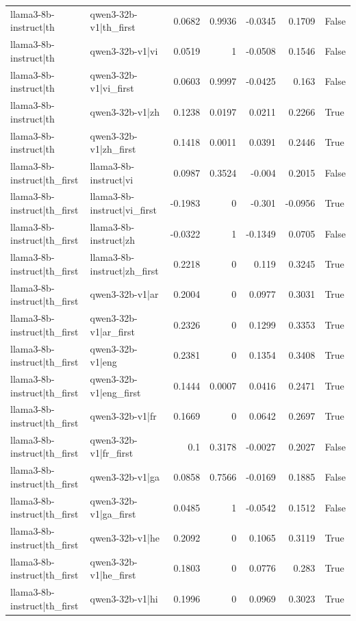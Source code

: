 \begin{table}
\begin{tabular}{l l r r r r l}
llama3-8b-instruct|th & qwen3-32b-v1|th_first & 0.0682 & 0.9936 & -0.0345 & 0.1709 & False \\
llama3-8b-instruct|th & qwen3-32b-v1|vi & 0.0519 & 1 & -0.0508 & 0.1546 & False \\
llama3-8b-instruct|th & qwen3-32b-v1|vi_first & 0.0603 & 0.9997 & -0.0425 & 0.163 & False \\
llama3-8b-instruct|th & qwen3-32b-v1|zh & 0.1238 & 0.0197 & 0.0211 & 0.2266 & True \\
llama3-8b-instruct|th & qwen3-32b-v1|zh_first & 0.1418 & 0.0011 & 0.0391 & 0.2446 & True \\
llama3-8b-instruct|th_first & llama3-8b-instruct|vi & 0.0987 & 0.3524 & -0.004 & 0.2015 & False \\
llama3-8b-instruct|th_first & llama3-8b-instruct|vi_first & -0.1983 & 0 & -0.301 & -0.0956 & True \\
llama3-8b-instruct|th_first & llama3-8b-instruct|zh & -0.0322 & 1 & -0.1349 & 0.0705 & False \\
llama3-8b-instruct|th_first & llama3-8b-instruct|zh_first & 0.2218 & 0 & 0.119 & 0.3245 & True \\
llama3-8b-instruct|th_first & qwen3-32b-v1|ar & 0.2004 & 0 & 0.0977 & 0.3031 & True \\
llama3-8b-instruct|th_first & qwen3-32b-v1|ar_first & 0.2326 & 0 & 0.1299 & 0.3353 & True \\
llama3-8b-instruct|th_first & qwen3-32b-v1|eng & 0.2381 & 0 & 0.1354 & 0.3408 & True \\
llama3-8b-instruct|th_first & qwen3-32b-v1|eng_first & 0.1444 & 0.0007 & 0.0416 & 0.2471 & True \\
llama3-8b-instruct|th_first & qwen3-32b-v1|fr & 0.1669 & 0 & 0.0642 & 0.2697 & True \\
llama3-8b-instruct|th_first & qwen3-32b-v1|fr_first & 0.1 & 0.3178 & -0.0027 & 0.2027 & False \\
llama3-8b-instruct|th_first & qwen3-32b-v1|ga & 0.0858 & 0.7566 & -0.0169 & 0.1885 & False \\
llama3-8b-instruct|th_first & qwen3-32b-v1|ga_first & 0.0485 & 1 & -0.0542 & 0.1512 & False \\
llama3-8b-instruct|th_first & qwen3-32b-v1|he & 0.2092 & 0 & 0.1065 & 0.3119 & True \\
llama3-8b-instruct|th_first & qwen3-32b-v1|he_first & 0.1803 & 0 & 0.0776 & 0.283 & True \\
llama3-8b-instruct|th_first & qwen3-32b-v1|hi & 0.1996 & 0 & 0.0969 & 0.3023 & True \\

\end{tabular}
\end{table}
